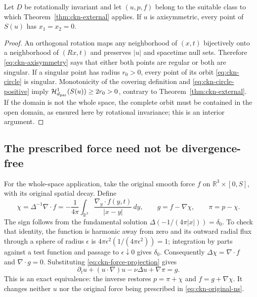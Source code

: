 \begin{proposition}\label{prop:ckn-interior}
Let $D$ be rotationally invariant and let $(u,p,f)$ belong to the suitable
class to which Theorem~\ref{thm:ckn-external} applies. If $u$ is
axisymmetric, every point of $S(u)$ has $x_1=x_2=0$.
\end{proposition}
\begin{proof}
An orthogonal rotation maps any neighborhood of $(x,t)$ bijectively onto
a neighborhood of $(Rx,t)$ and preserves $|u|$ and spacetime null sets.
Therefore \eqref{eq:ckn-axisymmetry} says that either both points are
regular or both are singular. If a singular point has radius $r_0>0$,
every point of its orbit \eqref{eq:ckn-circle} is singular. Monotonicity
of the covering definition and \eqref{eq:ckn-circle-positive} imply
$\mathcal H^1_{d_{\rm par}}(S(u))\geq2r_0>0$, contrary to
Theorem~\ref{thm:ckn-external}. If the domain is not the whole space,
the complete orbit must be contained in the open domain, as ensured
here by rotational invariance; this is an interior argument.
\end{proof}

\subsection{The prescribed force need not be divergence-free}

For the whole-space application, take the original smooth force $f$
on $\mathbb R^3\times[0,S]$, with its original spatial decay. Define
\begin{equation}\label{eq:ckn-force-projection}
 \chi=\Delta^{-1}\nabla\cdot f
 =-\frac1{4\pi}\int_{\mathbb R^3}
 \frac{\nabla_y\cdot f(y,t)}{|x-y|}\,dy,
 \qquad g=f-\nabla\chi,\qquad \pi=p-\chi.
\end{equation}
The sign follows from the fundamental solution
$\Delta(-1/(4\pi|x|))=\delta_0$. To check that identity, the function
is harmonic away from zero and its outward radial flux through a sphere
of radius $\epsilon$ is
$4\pi\epsilon^2(1/(4\pi\epsilon^2))=1$; integration by parts against
a test function and passage to $\epsilon\downarrow0$ gives $\delta_0$.
Consequently $\Delta\chi=\nabla\cdot f$ and $\nabla\cdot g=0$.
Substituting \eqref{eq:ckn-force-projection} gives
\begin{equation}\label{eq:ckn-projected-equation}
 \partial_tu+(u\cdot\nabla)u-\nu\Delta u+\nabla\pi=g.
\end{equation}
This is an exact equivalence: the inverse restores $p=\pi+\chi$ and
$f=g+\nabla\chi$. It changes neither $u$ nor the original force being
prescribed in \eqref{eq:ckn-original-ns}.

